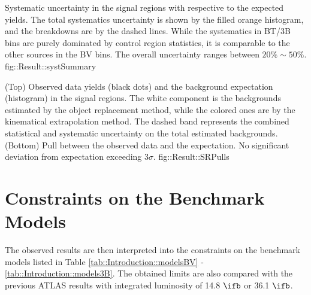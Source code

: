 \clearpage
{
    Systematic uncertainty in the signal regions with respective to the expected yields. 
    The total systematics uncertainty is shown by the filled orange histogram, 
    and the breakdowns are by the dashed lines.
    While the systematics in BT/3B bins are purely dominated by control region statistics, 
    it is comparable to the other sources in the BV bins. 
    The overall uncertainty ranges between $20\%\sim50\%$.
}       
{fig::Result::systSummary}

\clearpage
{
    (Top) Observed data yields (black dots) and the background expectation (histogram) in the signal regions. The white component is the backgrounds estimated by the object replacement method, while the colored ones are by the kinematical extrapolation method. The dashed band represents the combined statistical and systematic uncertainty on the total estimated backgrounds.
    (Bottom) Pull between the observed data and the expectation. No significant deviation from expectation exceeding $3\sigma$.
}
{fig::Result::SRPulls}

\clearpage


                                                                                                                         
\clearpage
\section{Constraints on the Benchmark Models}
The observed results are then interpreted into the constraints on the benchmark models listed in Table \ref{tab::Introduction::modelsBV} - \ref{tab::Introduction::models3B}. The obtained limits are also compared with the previous ATLAS results with integrated luminosity of 14.8 $\ifb$ or 36.1 $\ifb$.


